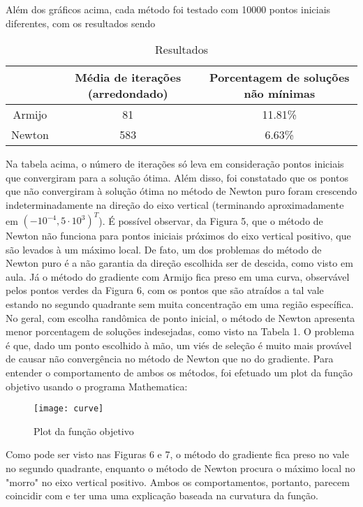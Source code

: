 \documentclass[a4paper, 12pt]{article}
\begin{document}
Além dos gráficos acima, cada método foi testado com 10000 pontos iniciais diferentes, com os resultados sendo
\begin{table}[H]
\centering
\begin{tabular}{|c||c|c|}
\hline&Média de iterações (arredondado)&Porcentagem de soluções não mínimas\\
\hline Armijo&81&11.81\%\\
\hline Newton&583&6.63\%\\
\hline
\end{tabular}
\caption{Resultados}
\end{table}
Na tabela acima, o número de iterações só leva em consideração pontos iniciais que convergiram para a solução ótima. Além disso, foi constatado que os pontos que não convergiram à solução ótima no método de Newton puro foram crescendo indeterminadamente na direção do eixo vertical (terminando aproximadamente em $(-10^{-4}, 5\cdot10^{3})^T$). É possível observar, da Figura 5, que o método de Newton não funciona para pontos iniciais próximos do eixo vertical positivo, que são levados à um máximo local. De fato, um dos problemas do método de Newton puro é a não garantia da direção escolhida ser de descida, como visto em aula. Já o método do gradiente com Armijo fica  preso em uma curva, observável pelos pontos verdes da Figura 6, com os pontos que são atraídos a tal vale estando no segundo quadrante sem muita concentração em uma região específica. No geral, com escolha randômica de ponto inicial, o método de Newton apresenta menor porcentagem de soluções indesejadas, como visto na Tabela 1. O problema é que, dado um ponto escolhido à mão, um viés de seleção é muito mais provável de causar não convergência no método de Newton que no do gradiente. Para entender o comportamento de ambos os métodos, foi efetuado um plot da função objetivo usando o programa Mathematica:
\begin{figure}[H]
  \centering
  \texttt{[image: curve]}
  \caption{Plot da função objetivo}
\end{figure}
Como pode ser visto nas Figuras 6 e 7, o método do gradiente fica preso no vale no segundo quadrante, enquanto o método de Newton procura o máximo local no "morro" no eixo vertical positivo. Ambos os comportamentos, portanto, parecem coincidir com e ter uma uma explicação baseada na curvatura da função.
\end{document}
